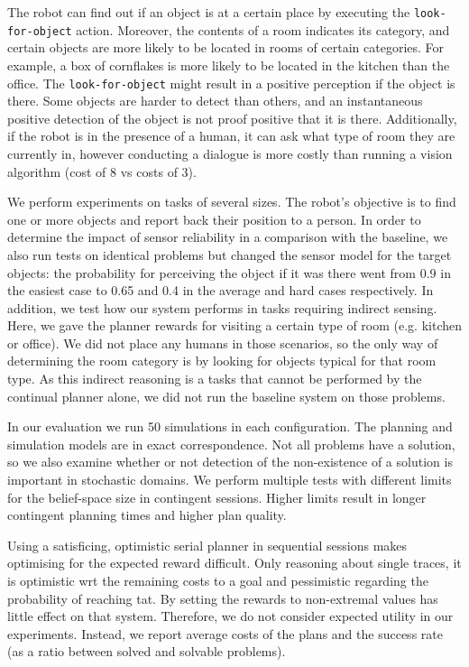 The robot can find out if an object is at a certain place by executing
the {\tt look-for-object} action. Moreover, the contents of a room
indicates its category, and certain objects are more likely to be
located in rooms of certain categories. For example, a box of
cornflakes is more likely to be located in the kitchen than the
office. The {\tt look-for-object} might result in a positive
perception if the object is there. Some objects are harder to detect
than others, and an instantaneous positive detection of the object is
not proof positive that it is there. Additionally, if the robot is in
the presence of a human, it can ask what type of room they are
currently in, however conducting a dialogue is more costly than
running a vision algorithm (cost of 8 vs costs of 3).

We perform experiments on tasks of several sizes. The robot's
objective is to find one or more objects and report back their
position to a person. In order to determine the impact of sensor
reliability in a comparison with the baseline, we also run tests on
identical problems but changed the sensor model for the target
objects: the probability for perceiving the object if it was there
went from 0.9 in the easiest case to 0.65 and 0.4 in the average and
hard cases respectively. In addition, we test how our system performs
in tasks requiring indirect sensing. Here, we gave the planner rewards
for visiting a certain type of room (e.g. kitchen or office). We did
not place any humans in those scenarios, so the only way of
determining the room category is by looking for objects typical for
that room type. As this indirect reasoning is a tasks that cannot be
performed by the continual planner alone, we did not run the baseline
system on those problems.



In our evaluation we run 50 simulations in each configuration. The
planning and simulation models are in exact correspondence. Not all
problems have a solution, so we also examine whether or not detection
of the non-existence of a solution is important in stochastic domains.
We perform multiple tests with different limits for the
belief-space size in contingent sessions.  Higher limits result in
longer contingent planning times and higher plan quality.


Using a satisficing, optimistic serial planner in sequential sessions
makes optimising for the expected reward difficult. Only reasoning
about single traces, it is optimistic wrt the remaining costs to a
goal and pessimistic regarding the probability of reaching tat. By
setting the rewards to non-extremal values has little effect on that
system. Therefore, we do not consider expected utility in our
experiments. Instead, we report average costs of the plans and the
success rate (as a ratio between solved and solvable problems).

